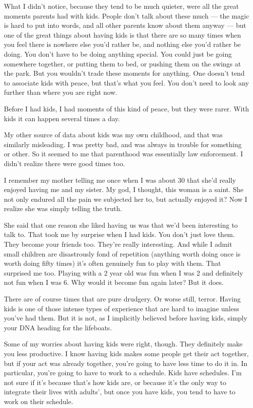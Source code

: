What I didn't notice, because they tend to be much quieter, were all the
great moments parents had with kids. People don't talk about these much
--- the magic is hard to put into words, and all other parents know
about them anyway --- but one of the great things about having kids is
that there are so many times when you feel there is nowhere else you'd
rather be, and nothing else you'd rather be doing. You don't have to be
doing anything special. You could just be going somewhere together, or
putting them to bed, or pushing them on the swings at the park. But you
wouldn't trade these moments for anything. One doesn't tend to associate
kids with peace, but that's what you feel. You don't need to look any
further than where you are right now.

Before I had kids, I had moments of this kind of peace, but they were
rarer. With kids it can happen several times a day.

My other source of data about kids was my own childhood, and that was
similarly misleading. I was pretty bad, and was always in trouble for
something or other. So it seemed to me that parenthood was essentially
law enforcement. I didn't realize there were good times too.

I remember my mother telling me once when I was about 30 that she'd
really enjoyed having me and my sister. My god, I thought, this woman is
a saint. She not only endured all the pain we subjected her to, but
actually enjoyed it? Now I realize she was simply telling the truth.

She said that one reason she liked having us was that we'd been
interesting to talk to. That took me by surprise when I had kids. You
don't just love them. They become your friends too. They're really
interesting. And while I admit small children are disastrously fond of
repetition (anything worth doing once is worth doing fifty times) it's
often genuinely fun to play with them. That surprised me too. Playing
with a 2 year old was fun when I was 2 and definitely not fun when I was
6. Why would it become fun again later? But it does.

There are of course times that are pure drudgery. Or worse still,
terror. Having kids is one of those intense types of experience that are
hard to imagine unless you've had them. But it is not, as I implicitly
believed before having kids, simply your DNA heading for the lifeboats.

Some of my worries about having kids were right, though. They definitely
make you less productive. I know having kids makes some people get their
act together, but if your act was already together, you're going to have
less time to do it in. In particular, you're going to have to work to a
schedule. Kids have schedules. I'm not sure if it's because that's how
kids are, or because it's the only way to integrate their lives with
adults', but once you have kids, you tend to have to work on their
schedule.

